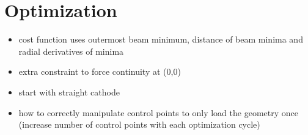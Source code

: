 \section{Optimization}
\begin{itemize}
  \item cost function uses outermost beam minimum, distance of beam minima and radial derivatives of minima
  \item extra constraint to force continuity at (0,0)
  \item start with straight cathode
  \item how to correctly manipulate control points to only load the geometry once (increase number of control points with each optimization cycle)
\end{itemize}

